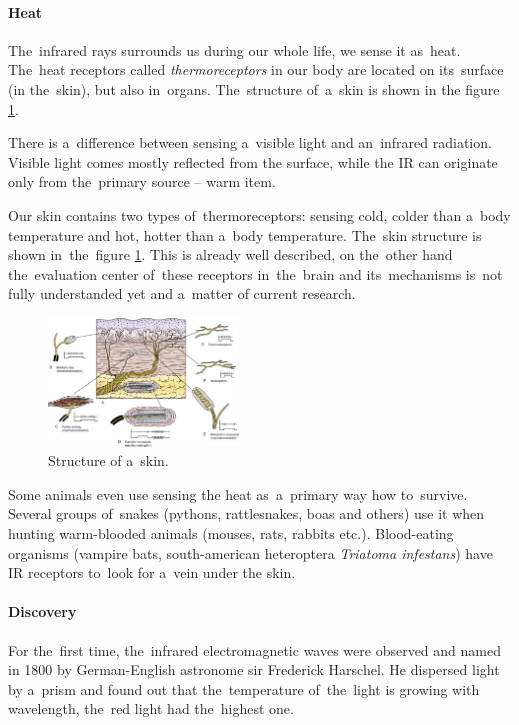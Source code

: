 \paragraph{Heat}
The~infrared rays surrounds us during our whole life, we sense it as~heat. The~heat receptors called
{\it thermoreceptors} in our body are located on its~surface (in the~skin), but also in~organs.
The~structure of~a~skin is shown in the figure \ref{fig:skin}. 

There is a~difference between sensing a~visible light and an~infrared radiation. Visible light comes
mostly reflected from the surface, while the IR can originate only from the~primary source -- warm item.

Our skin contains two types of~thermoreceptors: sensing cold, colder than a~body temperature and
hot, hotter than a~body temperature. The~skin structure is shown in~the~figure \ref{fig:skin}.
This is already well described, on the~other hand the~evaluation center of~these receptors in~the~brain
and its~mechanisms is~not fully understanded yet and a~matter of current research. \cite{BodilySenses}

\begin{figure}[h!]
\begin{center}
\includegraphics[width=0.45\textwidth]{obrazky-figures/skin.jpg}
\caption{Structure of a~skin. \cite{SkinStructure}\label{fig:skin}}
\end{center}    
\end{figure}

Some animals even use sensing the heat as~a~primary way how to~survive. Several groups of~snakes
(pythons, rattlesnakes, boas and others) use it when hunting warm-blooded animals (mouses, rats, rabbits etc.).
Blood-eating organisms (vampire bats, south-american heteroptera {\it Triatoma infestans})
have IR receptors to~look for a~vein under the skin.\cite{SnakeInfrared}


\paragraph{Discovery}
For the~first time, the~infrared electromagnetic waves were observed and named in 1800 by German-English
astronome sir Frederick Harschel. He dispersed light by a~prism and found out that the~temperature
of~the~light is growing with wavelength, the~red light had the~highest one.

